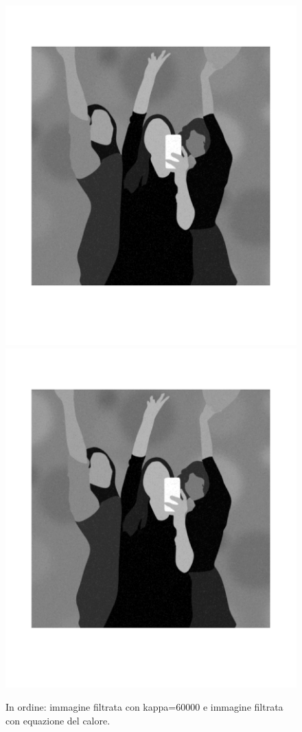 \begin{figure}[htb] \centering
\includegraphics[scale=0.15,trim={0 3cm 0 5cm},clip]{Pictures/Esempi di utilizzo/Esempio 4/party_caso_limite_kappaalto.png}
\includegraphics[scale=0.15,trim={0 3cm 0 5cm},clip]{Pictures/Esempi di utilizzo/Esempio 4/party_caso_limite_eq_calore.png}
\caption{In ordine: immagine filtrata con kappa=60000 e immagine filtrata con equazione del calore.}\label{fig:figura}
\end{figure} 
